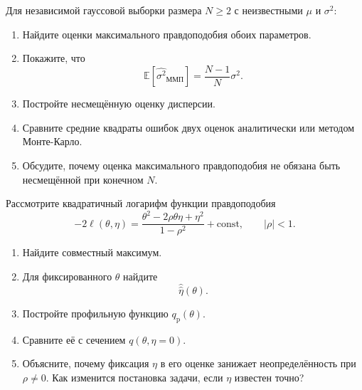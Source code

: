 \documentclass[
  russian,
  11pt,
  a4paper,
  open=any]{scrbook}
\providecommand{\tightlist}{%
  \setlength{\itemsep}{0pt}\setlength{\parskip}{0pt}}
\begin{document}
\begin{semanticpdfbox}[colback=BookCoralSoft,borderline west={1.2mm}{0pt}{BookCoral}]

\par\nopagebreak[4]\vspace{1.2mm}

Для независимой гауссовой выборки размера \(N\geq2\) с неизвестными
\(\mu\) и \(\sigma^2\):

\begin{enumerate}
\def\labelenumi{\arabic{enumi}.}
\tightlist
\item
  Найдите оценки максимального правдоподобия обоих параметров.
\item
  Покажите, что \[
  \mathbb E[\widehat{\sigma^2}_{\mathrm{ММП}}]
  =
  \frac{N-1}{N}\sigma^2.
  \]
\item
  Постройте несмещённую оценку дисперсии.
\item
  Сравните средние квадраты ошибок двух оценок аналитически или методом
  Монте-Карло.
\item
  Обсудите, почему оценка максимального правдоподобия не обязана быть
  несмещённой при конечном \(N\).
\end{enumerate}

\end{semanticpdfbox}

\begin{semanticpdfbox}[colback=BookCoralSoft,borderline west={1.2mm}{0pt}{BookCoral}]

\par\nopagebreak[4]\vspace{1.2mm}

Рассмотрите квадратичный логарифм функции правдоподобия \[
-2\ell(\theta,\eta)
=
\frac{\theta^2-2\rho\theta\eta+\eta^2}{1-\rho^2}
+\mathrm{const},
\qquad |\rho|<1.
\]

\begin{enumerate}
\def\labelenumi{\arabic{enumi}.}
\tightlist
\item
  Найдите совместный максимум.
\item
  Для фиксированного \(\theta\) найдите \[
  \widehat{\widehat\eta}(\theta).
  \]
\item
  Постройте профильную функцию \(q_{\mathrm{p}}(\theta)\).
\item
  Сравните её с сечением \(q(\theta,\eta=0)\).
\item
  Объясните, почему фиксация \(\eta\) в его оценке занижает
  неопределённость при \(\rho\ne0\). Как изменится постановка задачи,
  если \(\eta\) известен точно?
\end{enumerate}

\end{semanticpdfbox}
\end{document}
